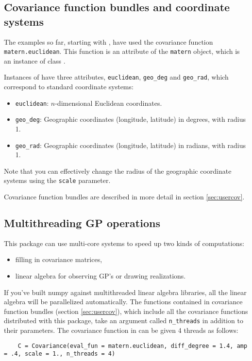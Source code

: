 \documentclass[]{manual}
\begin{document}
\subsection{Covariance function bundles and coordinate systems}
The examples so far, starting with , have used the covariance function \texttt{matern.euclidean}. This function is an attribute of the \texttt{matern} object, which is an instance of class .

Instances of  have three attributes, \texttt{euclidean}, \texttt{geo_deg} and \texttt{geo_rad}, which correspond to standard coordinate systems:
\begin{itemize}
    \item \texttt{euclidean}: $n$-dimensional Euclidean coordinates.
    \item \texttt{geo_deg}: Geographic coordinates (longitude, latitude) in degrees, with radius 1.
    \item \texttt{geo_rad}: Geographic coordinates (longitude, latitude) in radians, with radius 1.
\end{itemize}
Note that you can effectively change the radius of the geographic coordinate systems using the \texttt{scale} parameter.

Covariance function bundles are described in more detail in section \ref{sec:usercov}.

\subsection{Multithreading GP operations}
This package can use multi-core systems to speed up two kinds of computations:
\begin{itemize}
	\item filling in covariance matrices,
	\item linear algebra for observing GP's or drawing realizations.
\end{itemize}
If you've built numpy against multithreaded linear algebra libraries, all the linear algebra will be parallelized automatically. The functions contained in covariance function bundles (section \ref{sec:usercov}), which include all the covariance functions distributed with this package, take an argument called \texttt{n_threads} in addition to their parameters. The covariance function in  can be given 4 threads as follows:
\begin{verbatim}
	C = Covariance(eval_fun = matern.euclidean, diff_degree = 1.4, amp = .4, scale = 1., n_threads = 4)
\end{verbatim}
\end{document}
